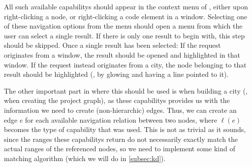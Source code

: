 \documentclass[../thesis]{subfiles}
\begin{document}
All such available \glspl{capability} should appear in the context menu of \SEE{}, either upon right-clicking a node, or right-clicking a code element in a \gls{window}.
Selecting one of these navigation options from the menu should open a menu from which the user can select a single result.
If there is only one result to begin with, this step should be skipped.
Once a single result has been selected:
If the request originates from a \gls{window}, the result should be opened and highlighted in that window.
If the request instead originates from a \gls{city}, the node belonging to that result should be highlighted (\eg, by glowing and having a line pointed to it).

The other important part in \SEE{} where this should be used is when building a city (\ie, when creating the project graph), as these \glspl{capability} provides us with the information we need to create (non-hierarchic) edges.
Thus, we can create an edge $e$ for each available navigation relation between two nodes, where $\ell(e)$ becomes the type of \gls{capability} that was used.
This is not as trivial as it sounds, since the \glspl{range} these \glspl{capability} return do not necessarily exactly match the actual \glspl{range} of the referenced nodes, so we need to implement some kind of matching algorithm (which we will do in \cref{subsec:kd}).
\end{document}
